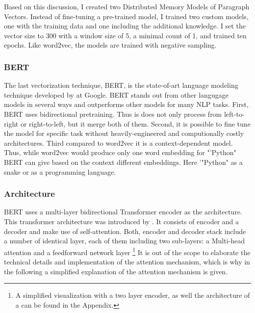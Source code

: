 \documentclass[12pt, a4paper, titlepage]{article}
\begin{document}
Based on this discussion, I created two Distributed Memory Models of Paragraph Vectors. Instead of fine-tuning a pre-trained model, I trained two custom models, one with the training data and one including the additional knowledge. I set the vector size to 300 with a window size of 5, a minimal count of 1, and trained ten epochs. Like word2vec, the models are trained with negative sampling. 

\subsubsection*{BERT}
The last vectorization technique, \ac{BERT}, is the state-of-art language modeling technique developed by \citep{devlin2018} at Google. \ac{BERT} stands out from other langugage models in several ways and outperforms other models for many \ac{NLP} tasks. First, \ac{BERT} uses bidirectional pretraining. Thus is does not only process from left-to-right or right-to-left, but it merge both of them. Second, it is possible to fine tune the model for specific task without heavily-engineered and computionally costly architectures. Third compared to word2vec it is a context-dependent model. Thus, while word2vec would produce only one word embedding for "'Python" \ac{BERT} can give based on the context different embeddings. Here '"Python" as a snake or as a programming language. 

\subsubsection*{Architecture}
\ac{BERT} uses a multi-layer bidirectional Transformer encoder as the architecture. This transformer architecture was introduced by \citet{vaswani2017}. It consists of encoder and a decoder and make use of self-attention. Both, encoder and decoder stack include a number of identical layer, each of them including two sub-layers: a Multi-head attention and a feedforward network layer \footnote{A simplified visualization with a two layer encoder, as well the architecture of a  can be found in the Appendix.} It is out of the scope to elaborate the technical details and implementation of the attention mechanism, which is why in the following a simplified explanation of the attention mechanism is given. 
\end{document}
